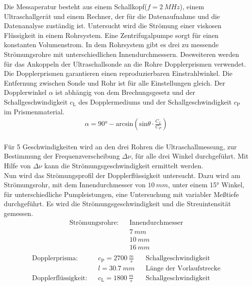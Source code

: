 %
Die Messaperatur besteht aus einem Schallkopf($f=\SI{2}{MHz}$), einem Ultraschallgerät und einem Rechner, der für die Datenaufnahme und die Datenanalyse zuständig ist.
Untersucht wird die Strömung einer viskosen Flüssigkeit in einem Rohrsystem. Eine Zentrifugalpumpe sorgt für einen konstanten Volumenstrom.
In dem Rohrsystem gibt es drei zu messende Strömungsrohre mit unterschiedlichen Innendurchmessern. Desweiteren werden für das Ankoppeln der Ultraschallsonde an die Rohre Dopplerprismen verwendet.
Die Dopplerprismen garantieren einen reproduzierbaren Einstrahlwinkel.  Die Entfernung zwischen Sonde und Rohr ist für alle Einstellungen gleich.
Der Dopplerwinkel $\alpha$ ist abhängig von dem Brechungsgesetz und der Schallgeschwindigkeit $c_\text{L}$ des Dopplermediums und der Schallgeschwindigkeit $c_\text{P}$ im Prismenmaterial.
\begin{align}
  \alpha=90°-\text{arcsin}\left(\text{sin}\theta\cdot \frac{C_L}{C_P}\right)
  \label{eqn:alpha}
\end{align}
\\Für 5 Geschwindigkeiten wird an den drei Rohren die Ultraschallmessung, zur Bestimmung der Frequenzverscheibung $\Delta\nu$, für alle drei Winkel durchgeführt.
Mit Hilfe von $\Delta\nu$ kann die Strömungsgeschwindigkeit ermittelt werden.
\\Nun wird das Strömungsprofil der Dopplerflüssigkeit untersucht. Dazu wird am Strömungsrohr, mit dem Innendurchmesser von $\SI{10}{mm}$, unter einem 15° Winkel, für unterschiedliche Pumpleistungen, eine Untersuchung mit variabler Meßtiefe durchgeführt.
Es wird die Strömungsgeschwindigkeit und die Streuintensität gemessen.
\begin{align*}
  \text{Strömungsrohre}:&& \text{Innendurchmesser}\\
               &&    \SI{7}{mm}\\
               &&    \SI{10}{mm}\\
               &&    \SI{16}{mm}\\
\end{align*}
\begin{align*}
  \text{Dopplerprisma}:&&c_\text{P}=\SI{2700}{\frac{m}{s}}&&\text{Schallgeschwindigkeit}\\
                       &&l=\SI{30,7}{mm}&&\text{Länge der Vorlaufstrecke}\\
  \text{Dopplerflüssigkeit}: && c_\text{L}=\SI{1800}{\frac{m}{s}} && \text{Schallgeschwindigkeit}\\
\end{align*}
